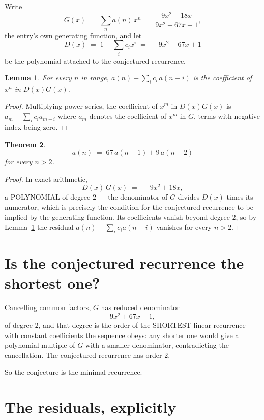 \documentclass[11pt,a4paper]{article}
\theoremstyle{plain}
\newtheorem{theorem}{Theorem}
\newtheorem{lemma}[theorem]{Lemma}
\theoremstyle{definition}
\begin{document}
Write
\[
G(x)\;=\;\sum_{n}a(n)\,x^{n}\;=\;\frac{9 x^{2} - 18 x}{9 x^{2} + 67 x - 1},
\]
the entry's own generating function, and let
\[
D(x)\;=\;1-\sum_i c_i x^{i}\;=\;- 9 x^{2} - 67 x + 1
\]
be the polynomial attached to the conjectured recurrence.

\begin{lemma}\label{lem:key}
For every $n$ in range, $a(n)-\sum_i c_i\,a(n-i)$ is the coefficient of $x^{n}$ in
$D(x)G(x)$.
\end{lemma}

\begin{proof}
Multiplying power series, the coefficient of $x^{m}$ in $D(x)G(x)$ is
$a_m-\sum_i c_i a_{m-i}$ where $a_m$ denotes the coefficient of $x^{m}$ in $G$, terms with
negative index being zero.
\end{proof}

\begin{theorem}
\[
a(n)\;=\;67\,a(n-1) + 9\,a(n-2)
\]
for every $n>2$.
\end{theorem}

\begin{proof}
In exact arithmetic,
\[
D(x)\,G(x)\;=\;- 9 x^{2} + 18 x,
\]
a POLYNOMIAL of degree $2$ --- the denominator of $G$ divides $D(x)$ times its numerator,
which is precisely the condition for the conjectured recurrence to be implied by the
generating function. Its coefficients vanish beyond degree $2$, so by
Lemma~\ref{lem:key} the residual $a(n)-\sum_ic_ia(n-i)$ vanishes for every
$n>2$.
\end{proof}

\section{Is the conjectured recurrence the shortest one?}

Cancelling common factors, $G$ has reduced denominator
\[
9 x^{2} + 67 x - 1,
\]
of degree $2$, and that degree is the order of the SHORTEST linear recurrence with
constant coefficients the sequence obeys: any shorter one would give a polynomial multiple of
$G$ with a smaller denominator, contradicting the cancellation. The conjectured recurrence has
order $2$.

So the conjecture is the minimal recurrence.

\section{The residuals, explicitly}
\end{document}
